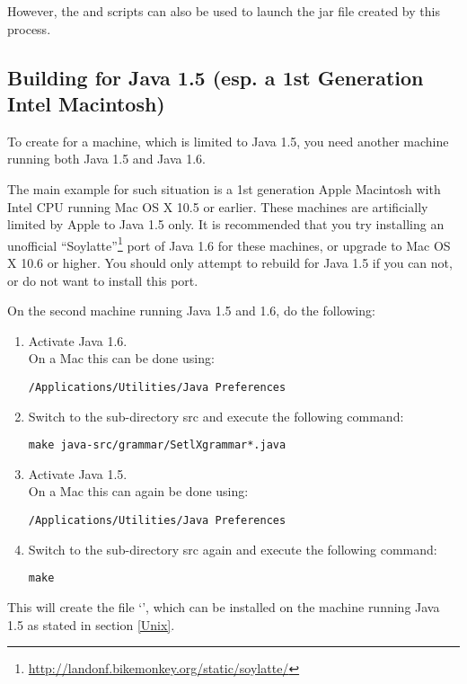 However, the  and  scripts can also be used to launch the jar file created by this process.

\subsection{Building for Java 1.5 (esp. a 1st Generation Intel Macintosh)}\label{MACj5}

To create \setlX{} for a machine, which is limited to Java 1.5, you need another machine running both Java 1.5 and Java 1.6.

The main example for such situation is a 1st generation Apple Macintosh with Intel CPU running Mac OS X 10.5 or earlier. These machines are artificially limited by Apple to Java 1.5 only. It is recommended that you try installing an unofficial ``Soylatte''\footnote{\url{http://landonf.bikemonkey.org/static/soylatte/}} port of Java 1.6 for these machines, or upgrade to Mac OS X 10.6 or higher. You should only attempt to rebuild \setlX{} for Java 1.5 if you can not, or do not want to install this port.

On the second machine running Java 1.5 and 1.6, do the following:

\begin{enumerate}
	\item Activate Java 1.6.\\
		On a Mac this can be done using:
\begin{lstlisting}[frame=none,numbers=none]
/Applications/Utilities/Java Preferences
\end{lstlisting}
	\item Switch to the sub-directory src and execute the following command:
\begin{lstlisting}[frame=none,numbers=none]
make java-src/grammar/SetlXgrammar*.java
\end{lstlisting}
	\item Activate Java 1.5.\\
		On a Mac this can again be done using:
\begin{lstlisting}[frame=none,numbers=none]
/Applications/Utilities/Java Preferences
\end{lstlisting}
	\item Switch to the sub-directory src again and execute the following command:
\begin{lstlisting}[frame=none,numbers=none]
make
\end{lstlisting}
\end{enumerate}
This will create the file `', which can be installed on the machine running Java 1.5 as stated in section \ref{Unix}.

